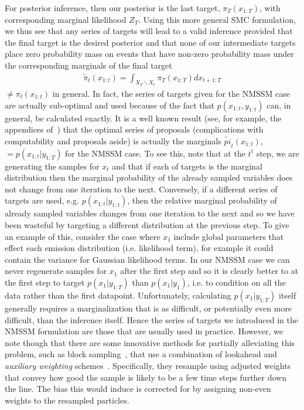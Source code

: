 For posterior inference, then our posterior is the
last target, $\pi_T (x_{1:T})$, with corresponding marginal likelihood $Z_T$.  Using this
more general SMC formulation, we thus see that any series of targets will lead
to a valid inference provided that the final target is the desired posterior and that none
of our intermediate targets place zero probability mass on events that have non-zero
probability mass under the corresponding marginals of the final target 
\begin{align}
\label{eq:part:opt-target}
\tilde{\pi}_t (x_{1:t}) = \int_{X_T \backslash X_t} \pi_T (x_{1:T}) dx_{t+1:T}
\end{align}
$\ne \pi_t (x_{1:t})$ in general.  In fact, the series of targets given
for the NMSSM case are actually sub-optimal and used because of the fact that
$p(x_{1:t},y_{1:t})$ can, in general, be calculated exactly.  It is a well known result
(see, for example, the appendices of~\cite{le2017auto}) that the optimal series
of proposals (complications with computability and proposals aside) is actually 
the marginals $\tilde{pi}_t (x_{1:t})$, $=p(x_{1:t} | y_{1:T})$ for
the NMSSM case.  To see this, note that at the $t^{\mathrm{t}}$ step, we are generating 
the samples for $x_{t}$ and that if each of targets is the marginal distribution then
the marginal probability of the already sampled variables does not change from
one iteration to the next.  Conversely, if a different series of targets are used,
e.g. $p(x_{1:t}|y_{1:t})$, then the relative marginal probability of already sampled
variables changes from one iteration to the next and so we have been wasteful by
targeting a different distribution at the previous step.  To give an example of this, consider
the case where $x_{1}$ include global parameters that effect each emission
distribution (i.e. likelihood term), for example it could contain the variance for Gaussian
likelihood terms.  In our NMSSM case we can never regenerate samples for $x_1$ after
the first step and so it is clearly better to at the first step to target $p(x_1 | y_{1:T})$ than $p(x_1|y_1)$,
i.e. to condition on all the data rather than the first datapoint. Unfortunately, calculating
$p(x_1 | y_{1:T})$ itself generally requires a marginalization that is as difficult, or potentially
even more difficult, than the inference itself.  Hence the series of targets we introduced in
the NMSSM formulation are those that are usually used in practice.  However, we note though that there are some
innovative methods for partially alleviating this problem, such as block sampling~\cite{doucet2006efficient},
that use a combination of lookahead and \emph{auxiliary weighting} schemes~\cite{cappe2007overview}.
Specifically, they resample using adjusted weights that convey how good the sample is likely
to be a few time steps further down the line.  The bias this would induce is corrected for
by assigning non-even weights to the resampled particles.

